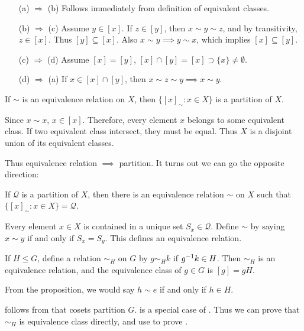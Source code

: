 \begin{pf}
\begin{itemize}[leftmargin=4.4em]
	\item[(a) $\Rightarrow$ (b)] Follows immediately from definition of equivalent classes.
	\item[(b) $\Rightarrow$ (c)] Assume $y\in [x]$. If $z\in [y]$, then $x\sim y\sim z$, and by transitivity, $z\in [x]$. Thus $[y]\subseteq [x]$. Also $x\sim y\implies y\sim x$, which implies $[x]\subseteq [y]$.
	\item[(c) $\Rightarrow$ (d)] Assume $[x]=[y]$, $[x]\cap [y]=[x]\supset \{x\}\ne \emptyset$.
	\item[(d) $\Rightarrow$ (a)] If $x\in [x]\cap [y]$, then $x\sim z\sim y\implies x\sim y$.
\end{itemize}
\end{pf}
\begin{corr}
If $\sim$ is an equivalence relation on $X$, then $\{[x]_\sim:x\in X\}$ is a partition of $X$.
\end{corr}
\begin{pf}
Since $x\sim x$, $x\in [x]$. Therefore, every element $x$ belongs to some equivalent class. If two equivalent class intersect, they must be equal. Thus $X$ is a disjoint union of its equivalent classes.
\end{pf}

Thus equivalence relation $\implies$ partition. It turns out we can go the opposite direction:

\begin{lemma}
If $\mathcal Q$ is a partition of $X$, then there is an equivalence relation $\sim$ on $X$ such that $\{[x]_\sim:x\in X\}=\mathcal Q$.
\end{lemma}
\begin{pf}
Every element $x\in X$ is contained in a unique set $S_x\in \mathcal Q$. Define $\sim$ by saying $x\sim y$ if and only if $S_x=S_y$. This defines an equivalence relation.
\end{pf}

\begin{prop}
If $H\le G$, define a relation $\sim_H$ on $G$ by $g\sim_H k$ if $g^{-1} k\in H$. Then $\sim_H$ is an equivalence relation, and the equivalence class of $g\in G$ is $[g]=gH$.
\end{prop}

\begin{remark}
From the proposition, we would say $h\sim e$ if and only if $h\in H$.

 follows from that cosets partition $G$.  is a special case of . Thus we can prove that $\sim_H$ is equivalence class directly, and use  to prove .
\end{remark}


